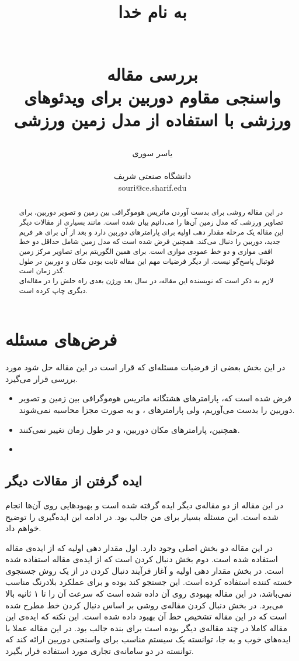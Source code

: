 \documentclass{report}
\title{
\begin{normalsize}
به نام خدا
\end{normalsize}
\\[2cm]
بررسی مقاله
\\[1cm]
واسنجی مقاوم دوربین برای ویدئوهای ورزشی با استفاده از مدل زمین ورزشی
}
\author{یاسر سوری
\\
\\ \small دانشگاه صنعتی شریف
\\ \small souri@ce.sharif.edu
}
\begin{document}
\maketitle

\begin{abstract}
در این مقاله روشی برای بدست آوردن ماتریس هوموگرافی بین زمین و تصویر دوربین، برای تصاویر ورزشی که مدل زمین آن‌ها را می‌دانیم بیان شده است. مانند بسیاری از مقالات دیگر این مقاله یک مرحله مقدار دهی اولیه برای پارامترهای دوربین دارد و بعد از آن برای هر فریم جدید، دوربین را دنبال  می‌کند. همچنین فرض شده است که مدل زمین شامل حداقل دو خط افقی موازی و دو خط عمودی موازی است. برای همین الگوریتم برای تصاویر مرکز زمین فوتبال پاسخ‌گو نیست. از دیگر فرضیات مهم این مقاله ثابت بودن مکان و  دوربین در طول گذر زمان است.
\\
لازم به ذکر است که نویسنده این مقاله، در سال بعد ورژن بعدی راه حلش را در مقاله‌ای دیگری چاپ کرده است\cite{new_paper}. 

\end{abstract}

\section{فرض‌های مسئله}
در این بخش بعضی از فرضیات مسئله‌ای که قرار است در این مقاله حل شود مورد بررسی قرار می‌گیرد.
\begin{itemize}
\item
فرض شده است که، پارامتر‌های هشتگانه ماتریس هوموگرافی بین زمین و تصویر دوربین را بدست می‌آوریم، ولی پارامترهای ،  و  به صورت مجزا محاسبه نمی‌شوند.
\item
همچنین، پارامترهای مکان دوربین،  و  در طول زمان تغییر نمی‌کنند.
\item
\end{itemize}
\subsection{ایده گرفتن از مقالات دیگر}
در این مقاله از دو مقاله‌ی دیگر ایده گرفته شده است و بهبود‌هایی روی آن‌ها انجام شده است. این مسئله بسیار برای من جالب بود. در ادامه این ایده‌گیری را توضیح خواهم داد.

در این مقاله دو بخش اصلی وجود دارد. اول مقدار دهی اولیه  که از ایده‌ی مقاله \cite{ct16} استفاده شده است. دوم بخش دنبال کردن است که از ایده‌ی مقاله \cite{ct15} استفاده شده است. در بخش مقدار دهی اولیه و آغاز فرآیند دنبال کردن در \cite{ct16} از یک روش جستجوی خسته کننده  استفاده کرده است. این جستجو کند بوده و برای عملکرد بلادرنگ مناسب نمی‌باشد، در این مقاله بهبودی روی آن داده شده است که سرعت آن را تا ۱ ثانیه بالا می‌برد. در بخش دنبال کردن مقاله‌ی \cite{ct15} روشی بر اساس دنبال کردن خط مطرح شده است که در این مقاله تشخیص خط آن بهبود داده شده است.
این نکته که ایده‌ی این مقاله کاملا در چند مقاله‌ی دیگر بوده است برای بنده جالب بود. در این مقاله عملا با ایده‌های خوب و به جا، توانسته یک سیستم مناسب برای واسنجی دوربین ارائه کند که توانسته در دو سامانه‌ی تجاری مورد استفاده قرار بگیرد.
\end{document}

